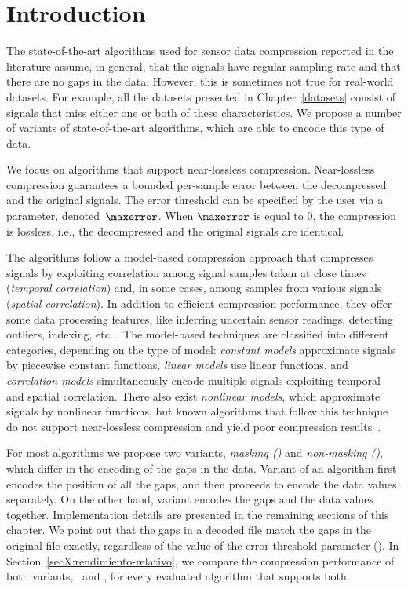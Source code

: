 

\section{Introduction}
\label{algo:overview}


The state-of-the-art algorithms used for sensor data compression reported in the literature \cite{AnEva2013, Signal2016} assume, in general, that the signals have regular sampling rate and that there are no gaps in the data. However, this is sometimes not true for real-world datasets. For example, all the datasets presented in Chapter~\ref{datasets} consist of signals that miss either one or both of these characteristics. We propose a number of variants of state-of-the-art algorithms, which are able to encode this type of data. 


We focus on algorithms that support near-lossless compression. Near-lossless compression guarantees a bounded per-sample error between the decompressed and the original signals. The error threshold can be specified by the user via a parameter, denoted~$\maxerror$. When $\maxerror$ is equal to 0, the compression is lossless, i.e., the decompressed and the original signals are identical.


The algorithms follow a model-based compression approach that compresses signals by exploiting correlation among signal samples taken at close times (\textit{temporal correlation}) and, in some cases, among samples from various signals (\textit{spatial correlation}). In addition to efficient compression performance, they offer some data processing features, like inferring uncertain sensor readings, detecting outliers, indexing, etc. \cite{AnEva2013}. The model-based techniques are classified into different categories, depending on the type of model: \textit{constant models} approximate signals by piecewise constant functions, \textit{linear models} use linear functions, and \textit{correlation models} simultaneously encode multiple signals exploiting temporal and spatial correlation. There also exist \textit{nonlinear models}, which approximate signals by nonlinear functions, but known algorithms that follow this technique do not support near-lossless compression and yield poor compression results~\cite{AnEva2013}. 


For most algorithms we propose two variants, \textit{masking (\maskalgo)} and \textit{non-masking (\NOmaskalgo)}, which differ in the encoding of the gaps in the data. Variant \maskalgo of an algorithm first encodes the position of all the gaps, and then proceeds to encode the data values separately. On the other hand, variant \NOmaskalgo encodes the gaps and the data values together. Implementation details are presented in the remaining sections of this chapter. We point out that the gaps in a decoded file match the gaps in the original file exactly, regardless of the value of the error threshold parameter (\maxerror). In Section~\ref{secX:rendimiento-relativo}, we compare the compression performance of both variants, \maskalgo\ and \NOmaskalgo, for every evaluated algorithm that supports both.


